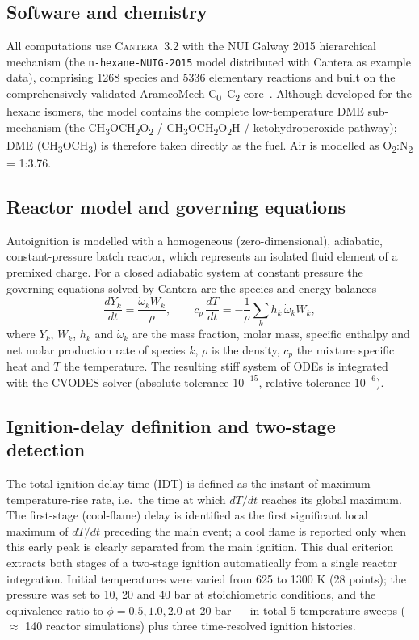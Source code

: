 \documentclass[11pt,a4paper]{article}
\newcommand{\dme}{\mbox{CH\textsubscript{3}OCH\textsubscript{3}}}
\begin{document}
\subsection{Software and chemistry}
All computations use \textsc{Cantera}~3.2 with the NUI Galway 2015 hierarchical
mechanism (the \texttt{n-hexane-NUIG-2015} model distributed with Cantera as
example data), comprising 1268 species and 5336 elementary reactions and built on
the comprehensively validated AramcoMech C\textsubscript{0}--C\textsubscript{2}
core~\cite{metcalfe2013}. Although developed for the hexane isomers, the model
contains the complete low-temperature DME sub-mechanism (the
CH\textsubscript{3}OCH\textsubscript{2}O\textsubscript{2} /
CH\textsubscript{3}OCH\textsubscript{2}O\textsubscript{2}H / ketohydroperoxide
pathway); DME (\dme) is therefore taken directly as the fuel. Air is modelled as
O\textsubscript{2}:N\textsubscript{2} = 1:3.76.

\subsection{Reactor model and governing equations}
Autoignition is modelled with a homogeneous (zero-dimensional), adiabatic,
constant-pressure batch reactor, which represents an isolated fluid element of a
premixed charge. For a closed adiabatic system at constant pressure the governing
equations solved by Cantera are the species and energy balances
\begin{equation}
\frac{dY_k}{dt} = \frac{\dot{\omega}_k W_k}{\rho}, \qquad
c_p\,\frac{dT}{dt} = -\frac{1}{\rho}\sum_k h_k\,\dot{\omega}_k W_k ,
\end{equation}
where $Y_k$, $W_k$, $h_k$ and $\dot{\omega}_k$ are the mass fraction, molar mass,
specific enthalpy and net molar production rate of species $k$, $\rho$ is the
density, $c_p$ the mixture specific heat and $T$ the temperature. The resulting
stiff system of ODEs is integrated with the CVODES solver (absolute tolerance
$10^{-15}$, relative tolerance $10^{-6}$).

\subsection{Ignition-delay definition and two-stage detection}
The total ignition delay time (IDT) is defined as the instant of maximum
temperature-rise rate, i.e.\ the time at which $dT/dt$ reaches its global maximum.
The first-stage (cool-flame) delay is identified as the first significant local
maximum of $dT/dt$ preceding the main event; a cool flame is reported only when
this early peak is clearly separated from the main ignition. This dual criterion
extracts both stages of a two-stage ignition automatically from a single reactor
integration. Initial temperatures were varied from 625 to 1300 K (28 points);
the pressure was set to 10, 20 and 40 bar at stoichiometric conditions, and the
equivalence ratio to $\phi = 0.5, 1.0, 2.0$ at 20 bar --- in total 5 temperature
sweeps ($\approx$ 140 reactor simulations) plus three time-resolved ignition
histories.
\end{document}

